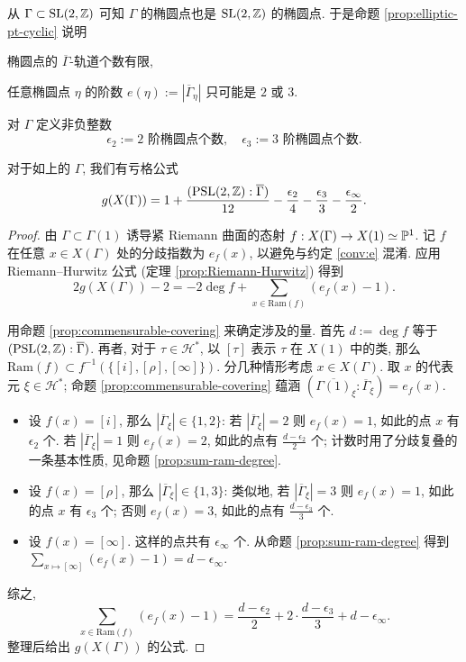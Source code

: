 从 $\Gamma \subset \operatorname{SL}(2,\mathbb{Z})$ 可知 $\Gamma$ 的椭圆点也是 $\operatorname{SL}(2,\mathbb{Z})$ 的椭圆点. 于是命题 \ref{prop:elliptic-pt-cyclic} 说明
\begin{compactitem}
	\item 椭圆点的 $\overline{\Gamma}$-轨道个数有限,
	\item 任意椭圆点 $\eta$ 的阶数 $e(\eta) := \left| \overline{\Gamma}_\eta \right|$ 只可能是 $2$ 或 $3$.
\end{compactitem}

对 $\Gamma$ 定义非负整数
\begin{equation*}
	\epsilon_2 := \text{2 阶椭圆点个数}, \quad \epsilon_3 := \text{3 阶椭圆点个数}.
\end{equation*}

\begin{proposition}\label{prop:genus-formula}
	对于如上的 $\Gamma$, 我们有亏格公式
	\[ g(X(\Gamma)) = 1 + \dfrac{(\operatorname{PSL}(2,\mathbb{Z}) : \overline{\Gamma})}{12} - \dfrac{\epsilon_2}{4} - \dfrac{\epsilon_3}{3} - \dfrac{\epsilon_\infty}{2}. \]
\end{proposition}
\begin{proof}
	由 $\Gamma \subset \Gamma(1)$ 诱导紧 Riemann 曲面的态射 $f: X(\Gamma) \to X(1) \simeq \mathbb{P}^1$. 记 $f$ 在任意 $x \in X(\Gamma)$ 处的分歧指数为 $e_f(x)$, 以避免与约定 \ref{conv:e} 混淆. 应用 Riemann--Hurwitz 公式 (定理 \ref{prop:Riemann-Hurwitz}) 得到
	\[ 2g(X(\Gamma)) - 2 = -2 \deg f + \sum_{x \in \mathrm{Ram}(f)} (e_f(x) - 1). \]

	用命题 \ref{prop:commensurable-covering} 来确定涉及的量. 首先 $d := \deg f$ 等于 $(\operatorname{PSL}(2,\mathbb{Z}) : \overline{\Gamma})$. 再者, 对于 $\tau \in \mathcal{H}^*$, 以 $[\tau]$ 表示 $\tau$ 在 $X(1)$ 中的类, 那么 $\mathrm{Ram}(f) \subset f^{-1}(\{ [i], [\rho], [\infty]\})$. 分几种情形考虑 $x \in X(\Gamma)$. 取 $x$ 的代表元 $\xi \in \mathcal{H}^*$; 命题 \ref{prop:commensurable-covering} 蕴涵 $\left(\overline{\Gamma(1)}_\xi : \overline{\Gamma}_\xi\right) = e_f(x)$.
	\begin{itemize}
		\item 设 $f(x) = [i]$, 那么 $|\overline{\Gamma}_\xi| \in \{1, 2\}$: 若 $|\overline{\Gamma}_\xi| = 2$ 则 $e_f(x)=1$, 如此的点 $x$ 有 $\epsilon_2$ 个. 若 $|\overline{\Gamma}_\xi| = 1$ 则 $e_f(x)=2$, 如此的点有 $\frac{d - \epsilon_2}{2}$ 个; 计数时用了分歧复叠的一条基本性质, 见命题 \ref{prop:sum-ram-degree}.
		\item 设 $f(x) = [\rho]$, 那么 $|\overline{\Gamma}_\xi| \in \{1, 3\}$: 类似地, 若 $|\overline{\Gamma}_\xi| = 3$ 则 $e_f(x)=1$, 如此的点 $x$ 有 $\epsilon_3$ 个; 否则 $e_f(x)=3$, 如此的点有 $\frac{d - \epsilon_3}{3}$ 个.
		\item 设 $f(x) = [\infty]$. 这样的点共有 $\epsilon_\infty$ 个. 从命题 \ref{prop:sum-ram-degree} 得到 $\sum_{x \mapsto [\infty]} (e_f(x) - 1) = d - \epsilon_\infty$.
	\end{itemize}
	综之,
	\[ \sum_{x \in \mathrm{Ram}(f)} (e_f(x) - 1) = \frac{d - \epsilon_2}{2} + 2 \cdot \frac{d - \epsilon_3}{3} + d - \epsilon_\infty. \]
	整理后给出 $g(X(\Gamma))$ 的公式.
\end{proof}

